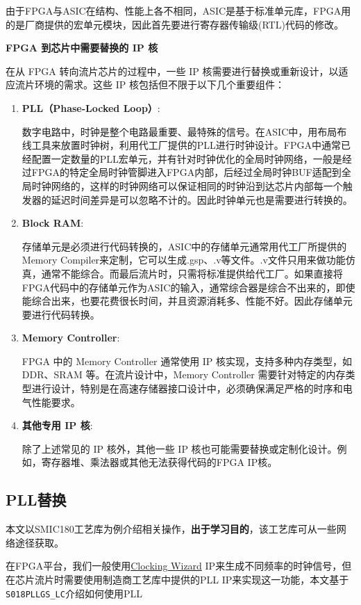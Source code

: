由于FPGA与ASIC在结构、性能上各不相同，ASIC是基于标准单元库，FPGA用的是厂商提供的宏单元模块，因此首先要进行寄存器传输级(RTL)代码的修改。

\textbf{FPGA 到芯片中需要替换的 IP 核}

在从 FPGA 转向流片芯片的过程中，一些 IP
核需要进行替换或重新设计，以适应流片环境的需求。这些 IP
核包括但不限于以下几个重要组件：

\begin{enumerate}
\def\labelenumi{\arabic{enumi}.}
\item
  \textbf{PLL（Phase-Locked Loop）}:

  数字电路中，时钟是整个电路最重要、最特殊的信号。在ASIC中，用布局布线工具来放置时钟树，利用代工厂提供的PLL进行时钟设计。FPGA中通常已经配置一定数量的PLL宏单元，并有针对时钟优化的全局时钟网络，一般是经过FPGA的特定全局时钟管脚进入FPGA内部，后经过全局时钟BUF适配到全局时钟网络的，这样的时钟网络可以保证相同的时钟沿到达芯片内部每一个触发器的延迟时间差异是可以忽略不计的。因此时钟单元也是需要进行转换的。
\item
  \textbf{Block RAM}:

  存储单元是必须进行代码转换的，ASIC中的存储单元通常用代工厂所提供的Memory
  Compiler来定制，它可以生成.gsp、.v等文件。.v文件只用来做功能仿真，通常不能综合。而最后流片时，只需将标准提供给代工厂。如果直接将FPGA代码中的存储单元作为ASIC的输入，通常综合器是综合不出来的，即使能综合出来，也要花费很长时间，并且资源消耗多、性能不好。因此存储单元要进行代码转换。
\item
  \textbf{Memory Controller}:

  FPGA 中的 Memory Controller 通常使用 IP 核实现，支持多种内存类型，如
  DDR、SRAM 等。在流片设计中，Memory Controller
  需要针对特定的内存类型进行设计，特别是在高速存储器接口设计中，必须确保满足严格的时序和电气性能要求。
\item
  \textbf{其他专用 IP 核}:

  除了上述常见的 IP 核外，其他一些 IP
  核也可能需要替换或定制化设计。例如，寄存器堆、乘法器或其他无法获得代码的FPGA
  IP核。
\end{enumerate}

\subsection{PLL替换}\label{sec:15-chip-preparation-003}

本文以SMIC180工艺库为例介绍相关操作，\textbf{出于学习目的}，该工艺库可从一些网络途径获取。

在FPGA平台，我们一般使用\href{https://www.xilinx.com/products/intellectual-property/clocking_wizard.html}{Clocking
Wizard}
IP来生成不同频率的时钟信号，但在芯片流片时需要使用制造商工艺库中提供的PLL
IP来实现这一功能，本文基于\texttt{S018PLLGS\_LC}介绍如何使用PLL


